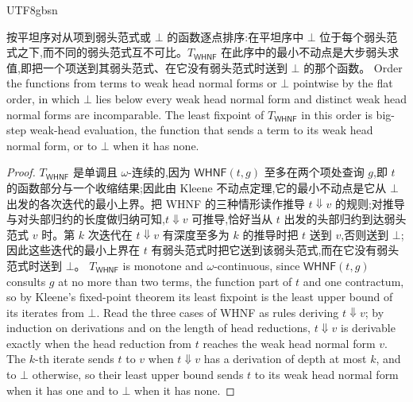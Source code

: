 \begin{CJK*}{UTF8}{gbsn}
  \begin{lemma}\label{lem:mono-llt}
    \ifPaperChinese
    按平坦序对从项到弱头范式或 $\bot$ 的函数逐点排序:在平坦序中 $\bot$ 位于每个弱头范式之下,而不同的弱头范式互不可比。$T_{\textsf{WHNF}}$ 在此序中的最小不动点是大步弱头求值,即把一个项送到其弱头范式、在它没有弱头范式时送到 $\bot$ 的那个函数。
    \else
    Order the functions from terms to weak head normal forms or $\bot$ pointwise by the flat order, in which $\bot$ lies below every weak head normal form and distinct weak head normal forms are incomparable. The least fixpoint of $T_{\textsf{WHNF}}$ in this order is big-step weak-head evaluation, the function that sends a term to its weak head normal form, or to $\bot$ when it has none.
    \fi
  \end{lemma}
  \begin{proof}
    \ifPaperChinese
    $T_{\textsf{WHNF}}$ 是单调且 $\omega$-连续的,因为 $\textsf{WHNF}(t, g)$ 至多在两个项处查询 $g$,即 $t$ 的函数部分与一个收缩结果;因此由 Kleene 不动点定理,它的最小不动点是它从 $\bot$ 出发的各次迭代的最小上界。把 \textsf{WHNF} 的三种情形读作推导 $t \Downarrow v$ 的规则;对推导与对头部归约的长度做归纳可知,$t \Downarrow v$ 可推导,恰好当从 $t$ 出发的头部归约到达弱头范式 $v$ 时。第 $k$ 次迭代在 $t \Downarrow v$ 有深度至多为 $k$ 的推导时把 $t$ 送到 $v$,否则送到 $\bot$;因此这些迭代的最小上界在 $t$ 有弱头范式时把它送到该弱头范式,而在它没有弱头范式时送到 $\bot$。
    \else
    $T_{\textsf{WHNF}}$ is monotone and $\omega$-continuous, since $\textsf{WHNF}(t, g)$ consults $g$ at no more than two terms, the function part of $t$ and one contractum, so by Kleene's fixed-point theorem its least fixpoint is the least upper bound of its iterates from $\bot$. Read the three cases of \textsf{WHNF} as rules deriving $t \Downarrow v$; by induction on derivations and on the length of head reductions, $t \Downarrow v$ is derivable exactly when the head reduction from $t$ reaches the weak head normal form $v$. The $k$-th iterate sends $t$ to $v$ when $t \Downarrow v$ has a derivation of depth at most $k$, and to $\bot$ otherwise, so their least upper bound sends $t$ to its weak head normal form when it has one and to $\bot$ when it has none.
    \fi
  \end{proof}


\end{CJK*}
